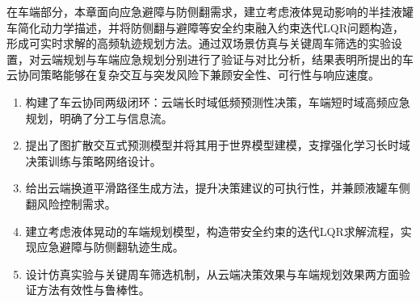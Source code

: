 在车端部分，本章面向应急避障与防侧翻需求，建立考虑液体晃动影响的半挂液罐车简化动力学描述，并将防侧翻与避障等安全约束融入约束迭代LQR问题构造，形成可实时求解的高频轨迹规划方法。通过双场景仿真与关键周车筛选的实验设置，对云端规划与车端应急规划分别进行了验证与对比分析，结果表明所提出的车云协同策略能够在复杂交互与突发风险下兼顾安全性、可行性与响应速度。

\begin{enumerate}[label=(\arabic*)]
  \item 构建了车云协同两级闭环：云端长时域低频预测性决策，车端短时域高频应急规划，明确了分工与信息流。
  \item 提出了图扩散交互式预测模型并将其用于世界模型建模，支撑强化学习长时域决策训练与策略网络设计。
  \item 给出云端换道平滑路径生成方法，提升决策建议的可执行性，并兼顾液罐车侧翻风险控制需求。
  \item 建立考虑液体晃动的车端规划模型，构造带安全约束的迭代LQR求解流程，实现应急避障与防侧翻轨迹生成。
  \item 设计仿真实验与关键周车筛选机制，从云端决策效果与车端规划效果两方面验证方法有效性与鲁棒性。
\end{enumerate}
